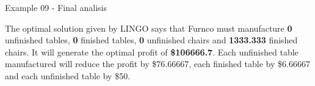 \begin{frame}{Example 09 - Final analisis}

The optimal solution given by LINGO says that Furnco must manufacture \textbf{0}
unfinished tables, \textbf{0} finished tables, \textbf{0} unfinished chairs and
\textbf{1333.333} finished chairs.
It will generate the optimal profit of \textbf{\$106666.7}. Each unfinished
table manufactured will reduce the profit by \$76.66667, each finished table
by \$6.66667 and each unfinished table by \$50.

\end{frame}
